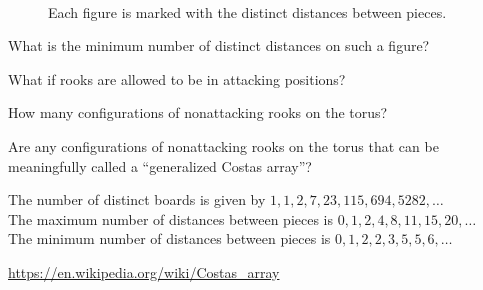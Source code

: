 \documentclass{article}
\begin{document}
\begin{figure}[!h]
\vspace{3mm}\\
  \caption{
    Each figure is marked with the distinct distances between pieces.
  }
\end{figure}

\begin{question}
  What is the minimum number of distinct distances on such a figure?
\end{question}
\begin{related}
  \item What if rooks are allowed to be in attacking positions?
  \item How many configurations of nonattacking rooks on the torus?
  \item Are any configurations of nonattacking rooks on the torus that can
    be meaningfully called a ``generalized Costas array''?
\end{related}
\begin{note}
  The number of distinct boards is given by $1,1,2,7,23,115,694,5282,\hdots$\\
  The maximum number of distances between pieces is $0,1,2,4,8,11,15,20,\hdots$\\
  The minimum number of distances between pieces is $0,1,2,2,3,5,5,6,\hdots$
\end{note}
\begin{references}
  \item \url{https://en.wikipedia.org/wiki/Costas_array}
\end{references}
\end{document}
